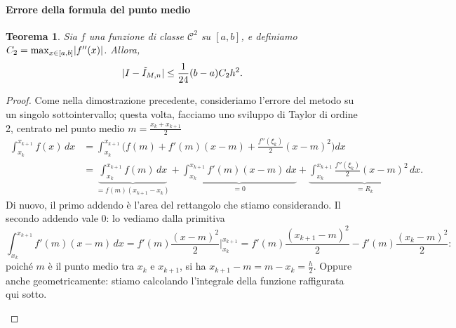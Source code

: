 \documentclass[a4paper]{report}
\DeclarePairedDelimiter{\abs}{\lvert}{\rvert}
\newtheorem{theorem}{Teorema}[chapter]
\theoremstyle{definiton}
\theoremstyle{remark}
\newcommand{\x}{\mathbf{x}}
\begin{document}
\paragraph{Errore della formula del punto medio}
\begin{theorem} \label{thm: errore metodo punto medio}
    Sia $f$ una funzione di classe $\mathcal{C}^2$ su $[a,b]$, e definiamo $C_2 = \max_{x\in [a,b]} \abs{f''(x)}$. Allora,
    \begin{equation} \label{midpoint method error}
        \abs{I - \tilde{I}_{M,n}} \leq \frac{1}{24} (b-a) C_2 h^2.
    \end{equation}
\end{theorem}
\begin{proof}
    Come nella dimostrazione precedente, consideriamo l'errore del metodo su un singolo sottointervallo; questa volta, facciamo uno sviluppo di Taylor di ordine 2, centrato nel punto medio $m = \frac{x_k+x_{k+1}}{2}$
    \begin{align*}
        \int_{x_k}^{x_{k+1}} f(x)\, dx &= \int_{x_k}^{x_{k+1}} \biggl(f(m)+f'(m)(x-m) +\frac{f''(\xi_k)}{2}(x-m)^2 \biggr)dx\\
        &= \underbrace{\int_{x_k}^{x_{k+1}} f(m)\, dx}_{=f(m)(x_{k+1}-x_k)} + \underbrace{\int_{x_k}^{x_{k+1}} f'(m)(x-m)\, dx}_{=0}
        + \underbrace{\int_{x_k}^{x_{k+1}} \frac{f''(\xi_k)}{2}(x-m)^2 \,dx}_{=R_k}.
    \end{align*}
    Di nuovo, il primo addendo è l'area del rettangolo che stiamo considerando. Il secondo addendo vale 0: lo vediamo dalla primitiva
    \[
    \int_{x_k}^{x_{k+1}} f'(m)(x-m)\, dx = f'(m)\frac{(x-m)^2}{2}\bigg|_{x_k}^{x_{k+1}} = f'(m)\frac{(x_{k+1}-m)^2}{2} - f'(m)\frac{(x_k-m)^2}{2}:
    \]
    poiché $m$ è il punto medio tra $x_k$ e $x_{k+1}$, si ha $x_{k+1}-m = m-x_k = \frac{h}{2}$. Oppure anche geometricamente: stiamo calcolando l'integrale della funzione raffigurata qui sotto.
\begin{center}
\end{center}
\end{proof}
\end{document}
